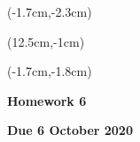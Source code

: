 \documentclass[12pt, oneside]{article}
\begin{document}
\begin{textblock*}{4cm}(-1.7cm,-2.3cm)
\end{textblock*}

\begin{textblock*}{8cm}(12.5cm,-1cm)
\end{textblock*}
\begin{textblock*}{13.5cm}(-1.7cm,-1.8cm)
\end{textblock*}

\vspace{1cm}

\begin{center}
\textbf{\Large Homework 6}

\textbf{Due 6 October 2020}
\end{center}
\end{document}
